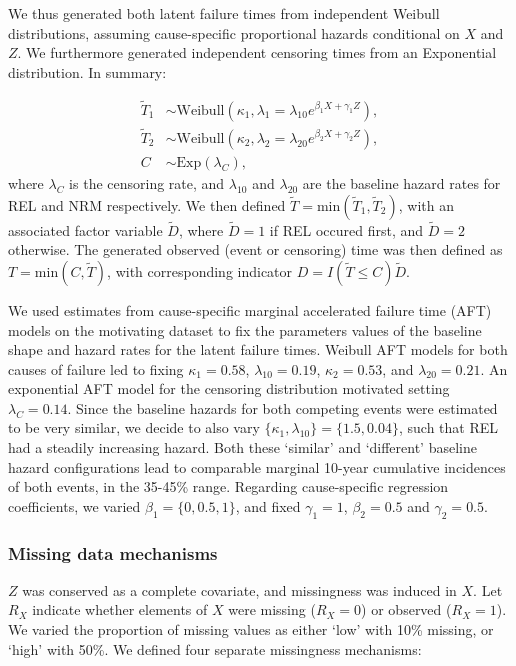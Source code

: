\documentclass[
  letterpaper,
  DIV=11,
  numbers=noendperiod]{scrreprt}
\begin{document}
We thus generated both latent failure times from independent Weibull
distributions, assuming cause-specific proportional hazards conditional
on \(X\) and \(Z\). We furthermore generated independent censoring times
from an Exponential distribution. In summary:

\begin{align*}
    \tilde{T}_1 &\sim \text{Weibull}(\kappa_1, \lambda_1 = \lambda_{10}e^{\beta_1 X + \gamma_1 Z}), \\
    \tilde{T}_2 &\sim \text{Weibull}(\kappa_2, \lambda_2 = \lambda_{20}e^{\beta_2 X + \gamma_2 Z}), \\
    C &\sim \text{Exp}(\lambda_C),
\end{align*} where \(\lambda_C\) is the censoring rate, and
\(\lambda_{10}\) and \(\lambda_{20}\) are the baseline hazard rates for
REL and NRM respectively. We then defined
\(\tilde{T} = \text{min}(\tilde{T}_1, \tilde{T}_2)\), with an associated
factor variable \(\tilde{D}\), where \(\tilde{D} =1\) if REL occured
first, and \(\tilde{D} = 2\) otherwise. The generated observed (event or
censoring) time was then defined as \(T = \text{min}(C, \tilde{T})\),
with corresponding indicator \(D = I(\tilde{T} \leq C)\tilde{D}\).

We used estimates from cause-specific marginal accelerated failure time
(AFT) models on the motivating dataset to fix the parameters values of
the baseline shape and hazard rates for the latent failure times.
Weibull AFT models for both causes of failure led to fixing
\(\kappa_1 = 0.58\), \(\lambda_{10} = 0.19\), \(\kappa_2 = 0.53\), and
\(\lambda_{20} = 0.21\). An exponential AFT model for the censoring
distribution motivated setting \(\lambda_C = 0.14\). Since the baseline
hazards for both competing events were estimated to be very similar, we
decide to also vary \(\{\kappa_1,\lambda_{10}\} = \{1.5,0.04\}\), such
that REL had a steadily increasing hazard. Both these `similar' and
`different' baseline hazard configurations lead to comparable marginal
10-year cumulative incidences of both events, in the 35-45\% range.
Regarding cause-specific regression coefficients, we varied
\(\beta_1 = \{0, 0.5, 1\}\), and fixed \(\gamma_1 = 1\),
\(\beta_2 = 0.5\) and \(\gamma_2 = 0.5\).

\subsubsection{Missing data mechanisms}\label{missing-data-mechanisms}

\(Z\) was conserved as a complete covariate, and missingness was induced
in \(X\). Let \(R_X\) indicate whether elements of \(X\) were missing
(\(R_X = 0\)) or observed (\(R_X = 1\)). We varied the proportion of
missing values as either `low' with 10\% missing, or `high' with 50\%.
We defined four separate missingness mechanisms:
\end{document}

